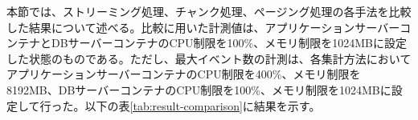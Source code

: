 \documentclass[../../main]{subfiles}
\begin{document}
    本節では、ストリーミング処理、チャンク処理、ページング処理の各手法を比較した結果について述べる。比較に用いた計測値は、アプリケーションサーバーコンテナとDBサーバーコンテナのCPU制限を100\%、メモリ制限を1024MBに設定した状態のものである。ただし、最大イベント数の計測は、各集計方法においてアプリケーションサーバーコンテナのCPU制限を400\%、メモリ制限を8192MB、DBサーバーコンテナのCPU制限を100\%、メモリ制限を1024MBに設定して行った。以下の表\ref{tab:result-comparison}に結果を示す。

    

    \clearpage
\end{document}

